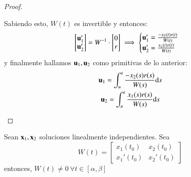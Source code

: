 \begin{proof}
\begin{enumerate}
    Sabiendo esto, $W(t)$ es invertible y entonces:
    $$
        \left[
            \begin{matrix}
                \mathbf{u}_1'\\
                \mathbf{u}_2'\\
            \end{matrix}
        \right] = W^{-1} \cdot
        \left[
            \begin{matrix}
                0\\
                r\\
            \end{matrix}
        \right] \implies
        \begin{cases}
            \mathbf{u}_1' = \frac{-x_2(t) r(t)}{W(t)}\\
            \mathbf{u}_2' = \frac{x_1(t) r(t)}{W(t)}
        \end{cases}
    $$ y finalmente hallamos $\mathbf{u}_1, \mathbf{u}_2$ como primitivas de lo anterior:
    \begin{gather*}
        \mathbf{u}_1 = \int_u^t \frac{-x_2(s) r(s)}{W(s)} \mathrm{d} s \\
        \mathbf{u}_2 = \int_u^t \frac{x_1(s) r(s)}{W(s)} \mathrm{d} s
    \end{gather*}
    \end{enumerate}
\end{proof}
\begin{pro}\label{pro:lin-impl-wrost}
    Sean $\mathbf{x}_1, \mathbf{x}_2$ soluciones linealmente independientes. Sea
    $$
        W(t) = \left[
        \begin{matrix}
            x_1(t_0) & x_2(t_0)\\
            x_1'(t_0) & x_2'(t_0)
        \end{matrix}
        \right]
    $$ entonces, $W(t) \neq 0\ \forall t\in[\alpha, \beta]$
\end{pro}

